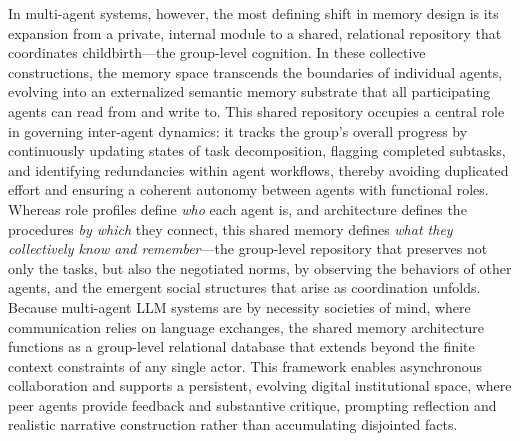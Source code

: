 \documentclass[11pt,a4paper]{article}
\begin{document}
In multi-agent systems, however, the most defining shift in memory design is its expansion from a private, internal module to a shared, relational repository that coordinates childbirth---the group-level cognition. In these collective constructions, the memory space transcends the boundaries of individual agents, evolving into an externalized semantic memory substrate that all participating agents can read from and write to. This shared repository occupies a central role in governing inter-agent dynamics: it tracks the group's overall progress by continuously updating states of task decomposition, flagging completed subtasks, and identifying redundancies within agent workflows, thereby avoiding duplicated effort and ensuring a coherent autonomy between agents with functional roles. Whereas role profiles define \emph{who} each agent is, and architecture defines the procedures \emph{by which} they connect, this shared memory defines \emph{what they collectively know and remember}---the group-level repository that preserves not only the tasks, but also the negotiated norms, by observing the behaviors of other agents, and the emergent social structures that arise as coordination unfolds. Because multi-agent LLM systems are by necessity societies of mind, where communication relies on language exchanges, the shared memory architecture functions as a group-level relational database that extends beyond the finite context constraints of any single actor. This framework enables asynchronous collaboration and supports a persistent, evolving digital institutional space, where peer agents provide feedback and substantive critique, prompting reflection and realistic narrative construction rather than accumulating disjointed facts.
\end{document}
